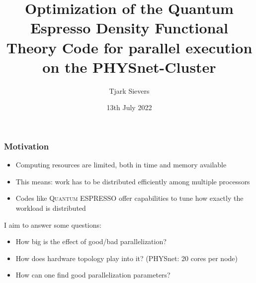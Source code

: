 \documentclass[aspectratio=169]{beamer}
\title[Bachelor's Colloquium]{Optimization of the Quantum Espresso Density Functional Theory Code for parallel execution on the PHYSnet-Cluster}
\author{Tjark Sievers}
\date{13th July 2022}
\institute[I. ITP -- AG Computational Condensed Matter Theory]{I. Institute of Theoretical Physics}
\newcommand{\QE}{\textsc{Quantum} ESPRESSO\xspace}
\begin{document}
{
\begin{frame}
	\titlepage
\end{frame}
}
\addtocounter{framenumber}{-1}

\begin{frame}
	\frametitle{Motivation}

	\begin{itemize}
		\item Computing resources are limited, both in time and memory available
		\item This means: work has to be distributed efficiently among multiple processors
		\item Codes like \QE offer capabilities to tune how exactly the workload is distributed
	\end{itemize}

	\vspace{10pt}

	I aim to answer some questions:

	\begin{itemize}
		\item How big is the effect of good/bad parallelization?
		\item How does hardware topology play into it? (PHYSnet: 20 cores per node)
		\item How can one find good parallelization parameters?
	\end{itemize}
\end{frame}
\end{document}
